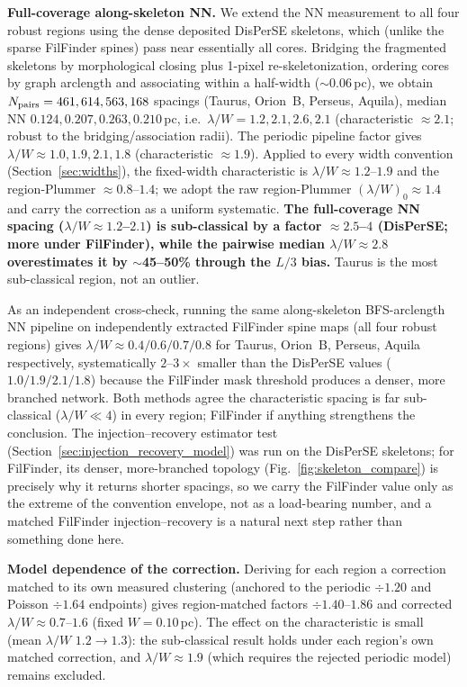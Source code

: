 \documentclass[usenatbib,twoside,twocolumn]{mnras}
\begin{document}
\textbf{Full-coverage along-skeleton NN.} We extend the NN measurement to all four robust regions using the dense deposited DisPerSE skeletons, which (unlike the sparse FilFinder spines) pass near essentially all cores. Bridging the fragmented skeletons by morphological closing plus 1-pixel re-skeletonization, ordering cores by graph arclength and associating within a half-width ($\sim$0.06\,pc), we obtain $N_{\rm pairs}=461,614,563,168$ spacings (Taurus, Orion~B, Perseus, Aquila), median NN $0.124,0.207,0.263,0.210$\,pc, i.e.\ $\lambda/W=1.2,2.1,2.6,2.1$ (characteristic $\approx2.1$; robust to the bridging/association radii). The periodic pipeline factor gives $\lambda/W\approx1.0,1.9,2.1,1.8$ (characteristic $\approx1.9$). Applied to every width convention (Section~\ref{sec:widths}), the fixed-width characteristic is $\lambda/W\approx1.2$--$1.9$ and the region-Plummer $\approx0.8$--$1.4$; we adopt the raw region-Plummer $(\lambda/W)_0\approx1.4$ and carry the correction as a uniform systematic. \textbf{The full-coverage NN spacing ($\lambda/W\approx1.2$--$2.1$) is sub-classical by a factor $\approx2.5$--$4$ (DisPerSE; more under FilFinder), while the pairwise median $\lambda/W\approx2.8$ overestimates it by $\sim$45--50\% through the $L/3$ bias.} Taurus is the most sub-classical region, not an outlier.

As an independent cross-check, running the same along-skeleton BFS-arclength NN pipeline on independently extracted FilFinder spine maps (all four robust regions) gives $\lambda/W\approx0.4/0.6/0.7/0.8$ for Taurus, Orion~B, Perseus, Aquila respectively, systematically $2$--$3\times$ smaller than the DisPerSE values ($1.0/1.9/2.1/1.8$) because the FilFinder mask threshold produces a denser, more branched network. Both methods agree the characteristic spacing is far sub-classical ($\lambda/W\ll4$) in every region; FilFinder if anything strengthens the conclusion. The injection--recovery estimator test (Section~\ref{sec:injection_recovery_model}) was run on the DisPerSE skeletons; for FilFinder, its denser, more-branched topology (Fig.~\ref{fig:skeleton_compare}) is precisely why it returns shorter spacings, so we carry the FilFinder value only as the extreme of the convention envelope, not as a load-bearing number, and a matched FilFinder injection--recovery is a natural next step rather than something done here.

\smallskip\noindent\textbf{Model dependence of the correction.}\label{sec:injection_recovery_model}
Deriving for each region a correction matched to its own measured clustering (anchored to the periodic $\div1.20$ and Poisson $\div1.64$ endpoints) gives region-matched factors $\div1.40$--$1.86$ and corrected $\lambda/W\approx0.7$--$1.6$ (fixed $W=0.10$\,pc). The effect on the characteristic is small (mean $\lambda/W$ $1.2\to1.3$): the sub-classical result holds under each region's own matched correction, and $\lambda/W\approx1.9$ (which requires the rejected periodic model) remains excluded.
\end{document}
